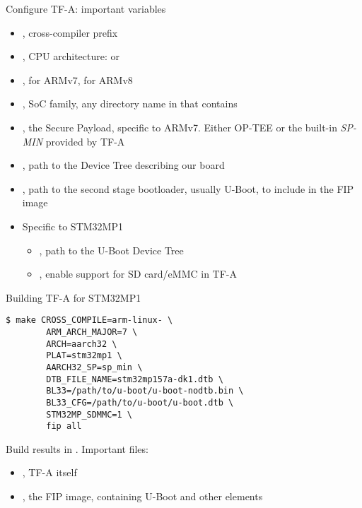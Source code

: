 \begin{frame}{Configure TF-A: important variables}
  \begin{itemize}
  \item {}, cross-compiler prefix
  \item {}, CPU architecture:  or 
  \item {},  for ARMv7,  for ARMv8
  \item {}, SoC family, any directory name in 
    that contains 
  \item {}, the Secure Payload, specific to
    ARMv7. Either OP-TEE or the built-in {\em SP-MIN} provided by TF-A
  \item {}, path to the Device Tree describing our board
  \item {}, path to the second stage bootloader, usually
    U-Boot, to include in the FIP image
  \item Specific to STM32MP1
    \begin{itemize}
    \item {}, path to the U-Boot Device Tree
    \item {}, enable support for SD card/eMMC in TF-A
    \end{itemize}
  \end{itemize}
\end{frame}

\begin{frame}[fragile]{Building TF-A for STM32MP1}
  \begin{block}{}
    {\footnotesize
\begin{verbatim}
$ make CROSS_COMPILE=arm-linux- \
        ARM_ARCH_MAJOR=7 \
        ARCH=aarch32 \
        PLAT=stm32mp1 \
        AARCH32_SP=sp_min \
        DTB_FILE_NAME=stm32mp157a-dk1.dtb \
        BL33=/path/to/u-boot/u-boot-nodtb.bin \
        BL33_CFG=/path/to/u-boot/u-boot.dtb \
        STM32MP_SDMMC=1 \
        fip all
\end{verbatim}
    }
  \end{block}

  Build results in . Important files:

  \begin{itemize}
  \item {}, TF-A itself
  \item {}, the FIP image, containing U-Boot and other
    elements
  \end{itemize}
\end{frame}

